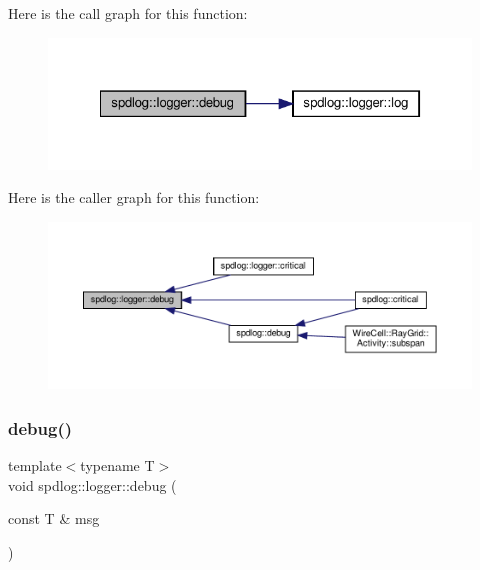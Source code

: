 Here is the call graph for this function\+:
\nopagebreak
\begin{figure}[H]
\begin{center}
\leavevmode
\includegraphics[width=322pt]{classspdlog_1_1logger_a1f60afc8308e0127c2eab2619ae352d5_cgraph}
\end{center}
\end{figure}
Here is the caller graph for this function\+:
\nopagebreak
\begin{figure}[H]
\begin{center}
\leavevmode
\includegraphics[width=350pt]{classspdlog_1_1logger_a1f60afc8308e0127c2eab2619ae352d5_icgraph}
\end{center}
\end{figure}
\mbox{\label{classspdlog_1_1logger_aca96637e71ab459738ccc7287be28c2e}} 
\subsubsection{\texorpdfstring{debug()}{debug()}\hspace{0.1cm}{\footnotesize\ttfamily [2/2]}}
{\footnotesize\ttfamily template$<$typename T$>$ \\
void spdlog\+::logger\+::debug (\begin{DoxyParamCaption}\item[{const T \&}]{msg }\end{DoxyParamCaption})\hspace{0.3cm}{\ttfamily [inline]}}



